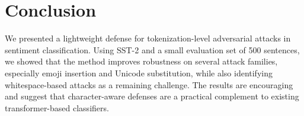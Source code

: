 \documentclass[11pt]{article}
\begin{document}
\section{Conclusion}
We presented a lightweight defense for tokenization-level adversarial attacks in sentiment classification. Using SST-2 and a small evaluation set of 500 sentences, we showed that the method improves robustness on several attack families, especially emoji insertion and Unicode substitution, while also identifying whitespace-based attacks as a remaining challenge. The results are encouraging and suggest that character-aware defenses are a practical complement to existing transformer-based classifiers.
\end{document}
